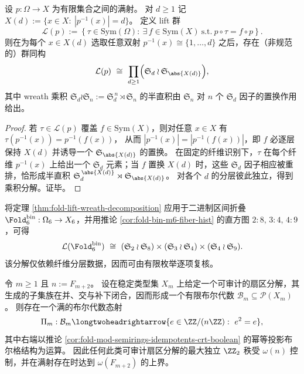 \begin{theorem}\label{thm:fold-lift-wreath-decomposition}
设 \(p:\Omega\to X\) 为有限集合之间的满射。
对 \(d\ge 1\) 记
\(
X(d):=\{x\in X:\ |p^{-1}(x)|=d\}
\)。
定义 lift 群
\[
\mathcal L(p)
:=\left\{\tau\in\mathrm{Sym}(\Omega):\ \exists\,f\in\mathrm{Sym}(X)\ \text{s.t.}\ p\circ\tau=f\circ p\right\}.
\]
则在为每个 \(x\in X(d)\) 选取任意双射 \(p^{-1}(x)\cong\{1,\dots,d\}\) 之后，存在（非规范的）群同构
\[
\mathcal L(p)\ \cong\ \prod_{d\ge 1}\Bigl(\mathfrak S_d\wr \mathfrak S_{\abs{X(d)}}\Bigr),
\]
其中 wreath 乘积 \(\mathfrak S_d\wr \mathfrak S_n:=\mathfrak S_d^{\,n}\rtimes \mathfrak S_n\) 的半直积由 \(\mathfrak S_n\) 对 \(n\) 个 \(\mathfrak S_d\) 因子的置换作用给出。
\end{theorem}
\begin{proof}
若 \(\tau\in\mathcal L(p)\) 覆盖 \(f\in\mathrm{Sym}(X)\)，则对任意 \(x\in X\) 有
\(
\tau(p^{-1}(x))=p^{-1}(f(x))
\)，
从而 \(|p^{-1}(x)|=|p^{-1}(f(x))|\)，即 \(f\) 必逐层保持 \(X(d)\) 并诱导一个 \(\mathfrak S_{\abs{X(d)}}\) 的置换。
在固定的纤维识别下，\(\tau\) 在每个纤维 \(p^{-1}(x)\) 上给出一个 \(\mathfrak S_d\) 元素；当 \(f\) 置换 \(X(d)\) 时，这些 \(\mathfrak S_d\) 因子相应被重排，恰形成半直积 \(\mathfrak S_d^{\,\abs{X(d)}}\rtimes \mathfrak S_{\abs{X(d)}}\)。
对各个 \(d\) 的分层彼此独立，得到乘积分解。证毕。
\end{proof}

\begin{remark}\label{rem:foldbin6-lift-wreath-normal-form}
将定理 \ref{thm:fold-lift-wreath-decomposition} 应用于二进制区间折叠 \(\Fold^{\mathrm{bin}}_6:\Omega_6\to X_6\)，并用推论 \ref{cor:fold-bin-m6-fiber-hist} 的直方图 \(2:8,\,3:4,\,4:9\)，可得
\[
\mathcal L(\Fold^{\mathrm{bin}}_6)\ \cong\ (\mathfrak S_2\wr \mathfrak S_{8})\times(\mathfrak S_3\wr \mathfrak S_{4})\times(\mathfrak S_4\wr \mathfrak S_{9}).
\]
该分解仅依赖纤维分层数据，因而可由有限枚举逐项复核。
\end{remark}

\begin{conjecture}\label{conj:fold-prime-sector-omega-bound}
令 \(m\ge 1\) 且 \(n:=F_{m+2}\)。
设在稳定类型集 \(X_m\) 上给定一个可审计的扇区分解，其生成的子集族在并、交与补下闭合，因而形成一个有限布尔代数 \(\mathcal B_m\subseteq \mathcal P(X_m)\)。
则存在一个满的布尔代数态射
\[
\Pi_m:\mathcal B_m\longtwoheadrightarrow \{e\in\ZZ/(n\ZZ):\ e^2=e\},
\]
其中右端以推论 \ref{cor:fold-mod-semirings-idempotents-crt-boolean} 的幂等投影布尔格结构为运算。
因此任何此类可审计扇区分解的最大独立 \(\ZZ_2\) 秩受 \(\omega(n)\) 控制，并在满射存在时达到 \(\omega(F_{m+2})\) 的上界。
\end{conjecture}

\endinput
